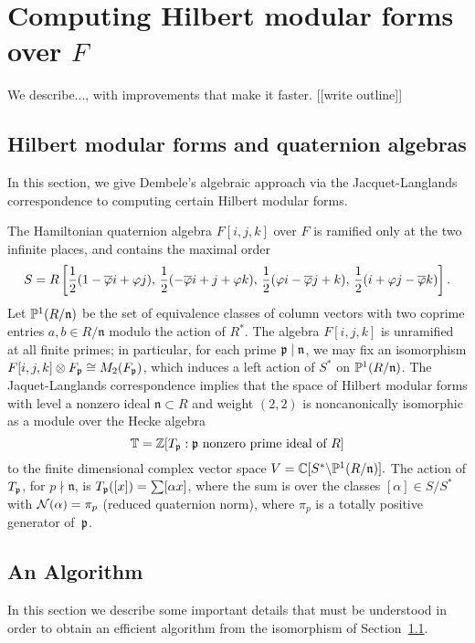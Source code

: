 \documentclass{amsart}
\newcommand{\n}{\mathfrak{n}}
\begin{document}
\section{Computing Hilbert modular forms over $F$}\label{sec:hmf}

We describe..., with improvements
that make it faster.   [[write outline]]

\subsection{Hilbert modular forms and quaternion 
algebras}\label{sec:dembele}
In this section, we give Dembele's algebraic approach
\cite{dembele:hilbert5} via the Jacquet-Langlands correspondence to
computing  certain Hilbert modular forms.

The Hamiltonian quaternion algebra $F[i,j,k]$ over $F$ is ramified
only at the two infinite places, and contains the maximal order
$$
 S = R\left[\frac{1}{2}(1-\overline{\varphi} i + \varphi j),\,
       \frac{1}{2}(-\overline{\varphi} i + j + \varphi k),\,
       \frac{1}{2}(\varphi i - \overline{\varphi} j + k), \,
       \frac{1}{2}(i + \varphi j - \overline{\varphi} k)\right].
$$
Let $\P^1(R/\n)$ be the set of equivalence classes of column vectors
with two coprime entries $a,b \in R/\n$ modulo the action of $R^*$.
The algebra $F[i,j,k]$ is unramified at all finite primes; in
particular, for each prime $\p\mid \n$, we may fix an isomorphism
$F[i,j,k]\otimes F_{\mathfrak{p}} \cong M_2(F_{\mathfrak{p}})$, which induces a left
action of $S^*$ on $\P^1(R/\n)$.
The Jaquet-Langlands correspondence implies that
the space of Hilbert modular forms with level a nonzero ideal
$\n \subset R$ and weight $(2,2)$ is
noncanonically isomorphic as a module over the Hecke algebra
$$\mathbb{T}=\mathbb{Z}[T_{\mathfrak{p}} :  \mathfrak{p} \text{ nonzero prime ideal of }R]$$ 
to the finite dimensional complex vector space $ V = \C[S^* \backslash
\P^1(R/\n)].  $ The action of $T_{\mathfrak{p}}$, for $p\nmid \n$, is
$T_{\mathfrak{p}}([x]) = \sum [\alpha x]$, where the sum is over the classes
$[\alpha]\in S/S^*$ with $\mathcal{N}(\alpha)=\pi_p$ (reduced quaternion norm),
where $\pi_p$ is a totally positive generator of~$\mathfrak{p}$.

\subsection{An Algorithm}

In this section we describe some important details that must be
understood in order to obtain an efficient algorithm from the
isomorphism of Section~\ref{sec:dembele}.
\end{document}
